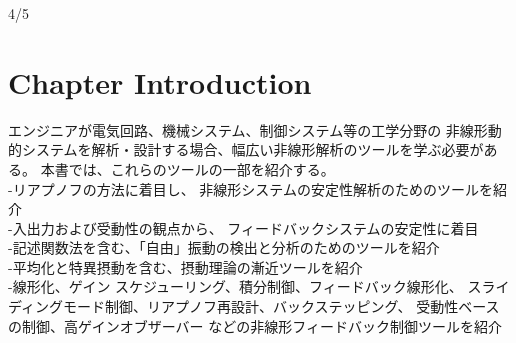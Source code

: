 \documentclass{jsarticle}
\begin{document}
4/5

\section*{Chapter Introduction}
    エンジニアが電気回路、機械システム、制御システム等の工学分野の
    非線形動的システムを解析・設計する場合、幅広い非線形解析のツールを学ぶ必要がある。
    本書では、これらのツールの一部を紹介する。\\
    -リアプノフの方法に着目し、
    非線形システムの安定性解析のためのツールを紹介\\
    -入出力および受動性の観点から、
    フィードバックシステムの安定性に着目\\
    -記述関数法を含む、「自由」振動の検出と分析のためのツールを紹介\\
    -平均化と特異摂動を含む、摂動理論の漸近ツールを紹介\\
    -線形化、ゲイン スケジューリング、積分制御、フィードバック線形化、
    スライディングモード制御、リアプノフ再設計、バックステッピング、
    受動性ベースの制御、高ゲインオブザーバー
    などの非線形フィードバック制御ツールを紹介\\
\end{document}
